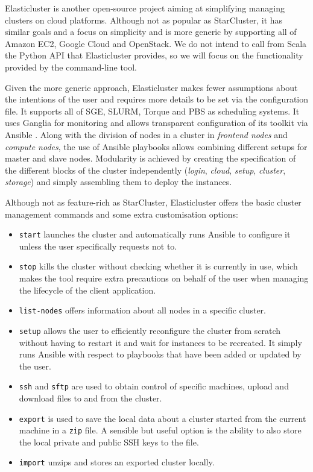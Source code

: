 Elasticluster \cite{Elasticluster} is another open-source project aiming at simplifying managing clusters on cloud platforms. Although not as popular as StarCluster, it has similar goals and a focus on simplicity and is more generic by supporting all of Amazon EC2, Google Cloud and OpenStack. We do not intend to call from Scala the Python API that Elasticluster provides, so we will focus on the functionality provided by the command-line tool.

Given the more generic approach, Elasticluster makes fewer assumptions about the intentions of the user and requires more details to be set via the configuration file. It supports all of SGE, SLURM, Torque and PBS as scheduling systems. It uses Ganglia \cite{Ganglia} for monitoring and allows transparent configuration of its toolkit via Ansible \cite{Ansible}. Along with the division of nodes in a cluster in \textit{frontend nodes} and \textit{compute nodes}, the use of Ansible playbooks allows combining different setups for master and slave nodes. Modularity is achieved by creating the specification of the different blocks of the cluster independently (\textit{login}, \textit{cloud}, \textit{setup}, \textit{cluster}, \textit{storage}) and simply assembling them to deploy the instances.

Although not as feature-rich as StarCluster, Elasticluster offers the basic cluster management commands and some extra customisation options:
\begin{itemize}
	\item \verb|start| launches the cluster and automatically runs Ansible to configure it unless the user specifically requests not to.
	\item \verb|stop| kills the cluster without checking whether it is currently in use, which makes the tool require extra precautions on behalf of the user when managing the lifecycle of the client application.
	\item \verb|list-nodes| offers information about all nodes in a specific cluster.
	\item \verb|setup| allows the user to efficiently reconfigure the cluster from scratch without having to restart it and wait for instances to be recreated. It simply runs Ansible with respect to playbooks that have been added or updated by the user.
	\item \verb|ssh| and \verb|sftp| are used to obtain control of specific machines, upload and download files to and from the 
cluster.
	\item \verb|export| is used to save the local data about a cluster started from the current machine in a \verb|zip| file. A sensible but useful option is the ability to also store the local private and public SSH keys to the file.
	\item \verb|import| unzips and stores an exported cluster locally.
\end{itemize}

